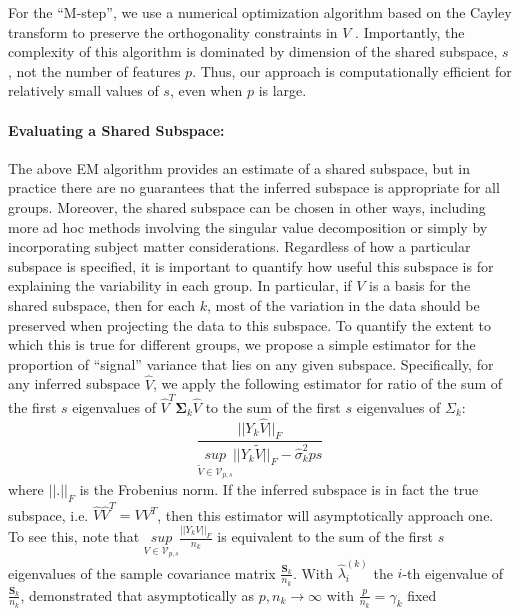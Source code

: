 \documentclass{article}
\newcommand{\bl}[1]{{\mathbf #1}}
\begin{document}
For the ``M-step'', we use a numerical optimization algorithm based on
the Cayley transform to preserve the orthogonality constraints in $V$
\citep{Wen2013}.  Importantly, the complexity of this algorithm is
dominated by dimension of the shared subspace, $s$, not the number of
features $p$.  Thus, our approach is computationally efficient for
relatively small values of $s$, even when $p$ is large.

\paragraph{Evaluating a Shared Subspace:}

The above EM algorithm provides an estimate of a shared subspace, but
in practice there are no guarantees that the inferred subspace is
appropriate for all groups.  Moreover, the shared subspace can be
chosen in other ways, including more ad hoc methods involving the
singular value decomposition or simply by incorporating subject matter
considerations.  Regardless of how a particular subspace is specified,
it is important to quantify how useful this subspace is for explaining
the variability in each group.  In particular, if $V$ is a basis for
the shared subspace, then for each $k$, most of the variation in the
data should be preserved when projecting the data to this subspace.
To quantify the extent to which this is true for different groups, we
propose a simple estimator for the proportion of ``signal'' variance
that lies on any given subspace.  Specifically, for any inferred
subspace $\hat{V}$, we apply the following estimator for ratio of
  the sum of the first $s$ eigenvalues of
  $\hat{V}^T\bl \Sigma_k \hat{V}$ to the sum of the first $s$
  eigenvalues of $\Sigma_k$:
%
\begin{equation}
 \frac{||Y_k\hat{V}||_F}{\underset{\widetilde{V} \in \mathcal{V}_{p, s}}{sup}
  ||Y_k\widetilde{V}||_F - \hat{\sigma}_k^2ps}
\label{eqn:ratio}
\end{equation}
%
\noindent where $||.||_F$ is the Frobenius norm. If the inferred
subspace is in fact the true subspace, i.e. $\hat{V}\hat{V}^T = VV^T$,
then this estimator will asymptotically approach one.  To see this,
note that
$\underset{V \in \mathcal{V}_{p, s}}{sup}\frac{||Y_kV||_F}{n_k}$ is
equivalent to the sum of the first $s$ eigenvalues of the sample
covariance matrix $\frac{\bl S_k}{n_k}$.  With $\hat{\lambda}^{(k)}_i$
the $i$-th eigenvalue of $\frac{\bl S_k}{n_k}$, \citet{Baik2006}
demonstrated that asymptotically as $p, n_k \rightarrow \infty$ with
$\frac{p}{n_k} = \gamma_k$ fixed
\end{document}
